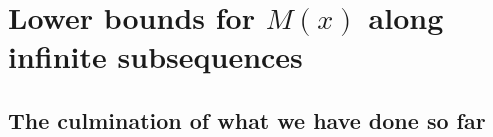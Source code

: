 \documentclass[11pt,reqno,a4letter]{article}
\numberwithin{figure}{section}
\numberwithin{table}{section}
\theoremstyle{plain}
\numberwithin{theorem}{section}
\theoremstyle{definition}
\begin{document}
\newpage
\section{Lower bounds for $M(x)$ along infinite subsequences} 
\label{Section_KeyApplications} 

\subsection{The culmination of what we have done so far} 

\nocite{OPERADECRIBERO}
\end{document}
